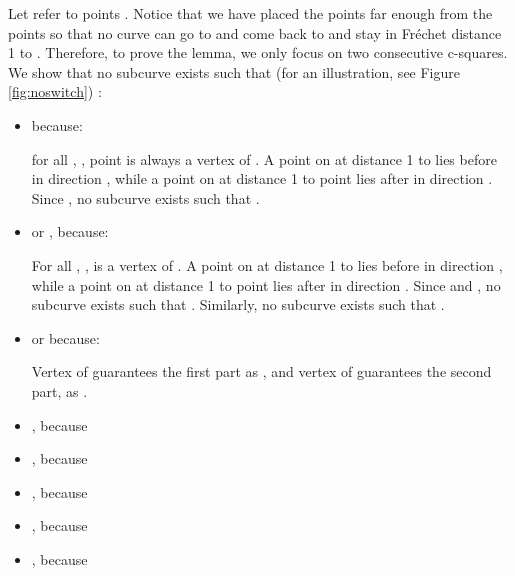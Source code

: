 \documentclass[12pt]{dalthesis}
\def\favoritefont{\bfseries \sffamily}
\def\QED{\ensuremath{{\Box}}}
\def\markatright#1{\leavevmode\unskip\nobreak\quad\hspace*{\fill}{#1}}
\newenvironment{proof}
	{\begin{trivlist}\item[\hskip\labelsep{\favoritefont Proof:}]}
	{\markatright{\QED}\end{trivlist}}
\newcommand{\Frechet}{Fr\'echet }
\begin{document}
\begin{proof}
Let 
 refer to 
points .
Notice that we have placed the  points far enough from 
the  points so that 
no curve can go to 
and come back to  and stay 
in \Frechet distance 1 to .
Therefore, to prove the lemma, 
we only focus on two consecutive c-squares.
We show that no subcurve  exists such 
that (for an illustration, see Figure \ref{fig:noswitch}) :


\begin{itemize}

\item  because:



for all , , point  is always a vertex of . 
A point on  at distance 1 
to  lies before  
in direction , 
while a point on  at distance 1 
to point  lies after  in direction .
Since , 
no subcurve  exists such that 
.




\item  or , because:



For all , , 
is a vertex of . 
A point on  at distance 1 
to  lies before  
in direction , 
while a point on  at distance 1 
to point  lies after  in direction .
Since  and 
,
no subcurve  exists such that 
.
Similarly,  no subcurve  exists such that 
.



\item  or   because:



Vertex  of 
guarantees the first part as , 
and vertex  of 
guarantees the second part, 
as .



\item ,  because 



\item , because  



\item  , because  



\item  , because  



\item  , because  
\end{itemize}


\end{proof}
\end{document}
